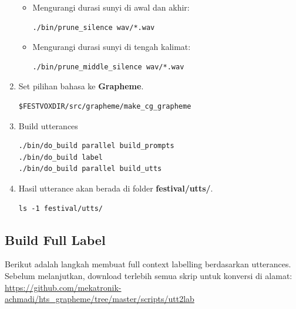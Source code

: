 \documentclass[12pt,]{article}
\begin{document}
\begin{enumerate}
\begin{itemize}
			\item Mengurangi durasi sunyi di awal dan akhir:
			\begin{verbatim}
./bin/prune_silence wav/*.wav
			\end{verbatim}
			
			\item Mengurangi durasi sunyi di tengah kalimat:
			\begin{verbatim}
./bin/prune_middle_silence wav/*.wav
			\end{verbatim}
			
		\end{itemize}

		\item Set pilihan bahasa ke \textbf{Grapheme}.
		\begin{verbatim}
$FESTVOXDIR/src/grapheme/make_cg_grapheme
		\end{verbatim}
		
		\item Build utterances
		\begin{verbatim}
./bin/do_build parallel build_prompts
./bin/do_build label
./bin/do_build parallel build_utts
		\end{verbatim}
		
		\item Hasil utterance akan berada di folder \textbf{festival/utts/}.
		\begin{verbatim}
ls -1 festival/utts/
		\end{verbatim}
		
	\end{enumerate}
	
	\newpage
	\subsection{Build Full Label}
	
	Berikut adalah langkah membuat full context labelling berdasarkan utterances.
	Sebelum melanjutkan, download terlebih semua skrip untuk konversi di alamat:\\
	\url{https://github.com/mekatronik-achmadi/hts_grapheme/tree/master/scripts/utt2lab}
	
\end{document}
